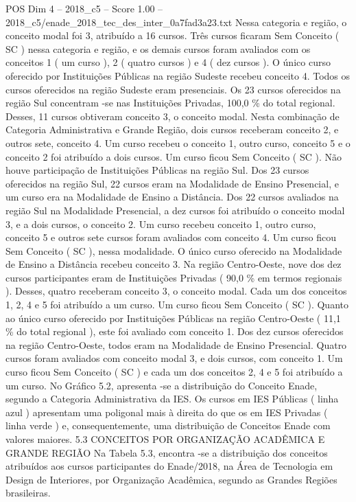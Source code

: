 \begin{textsample}{POS Dim 4 – 2018\_c5 – Score 1.00 – 2018\_c5/enade\_2018\_tec\_des\_inter\_0a7fad3a23.txt}
Nessa categoria e região, o conceito modal foi 3, atribuído a 16 cursos.
Três cursos ficaram Sem Conceito ( SC ) nessa categoria e região, e os demais cursos foram avaliados com os conceitos 1 ( um curso ), 2 ( quatro cursos ) e 4 ( dez cursos ).
O único curso oferecido por Instituições Públicas na região Sudeste recebeu conceito 4.
Todos os cursos oferecidos na região Sudeste eram presenciais.
Os 23 cursos oferecidos na região Sul concentram -se nas Instituições Privadas, 100,0 \% do total regional.
Desses, 11 cursos obtiveram conceito 3, o conceito modal.
Nesta combinação de Categoria Administrativa e Grande Região, dois cursos receberam conceito 2, e outros sete, conceito 4.
Um curso recebeu o conceito 1, outro curso, conceito 5 e o conceito 2 foi atribuído a dois cursos.
Um curso ficou Sem Conceito ( SC ).
Não houve participação de Instituições Públicas na região Sul.
Dos 23 cursos oferecidos na região Sul, 22 cursos eram na Modalidade de Ensino Presencial, e um curso era na Modalidade de Ensino a Distância.
Dos 22 cursos avaliados na região Sul na Modalidade Presencial, a dez cursos foi atribuído o conceito modal 3, e a dois cursos, o conceito 2.
Um curso recebeu conceito 1, outro curso, conceito 5 e outros sete cursos foram avaliados com conceito 4.
Um curso ficou Sem Conceito ( SC ), nessa modalidade.
O único curso oferecido na Modalidade de Ensino a Distância recebeu conceito 3.
Na região Centro-Oeste, nove dos dez cursos participantes eram de Instituições Privadas ( 90,0 \% em termos regionais ).
Desses, quatro receberam conceito 3, o conceito modal.
Cada um dos conceitos 1, 2, 4 e 5 foi atribuído a um curso.
Um curso ficou Sem Conceito ( SC ).
Quanto ao único curso oferecido por Instituições Públicas na região Centro-Oeste ( 11,1 \% do total regional ), este foi avaliado com conceito 1.
Dos dez cursos oferecidos na região Centro-Oeste, todos eram na Modalidade de Ensino Presencial.
Quatro cursos foram avaliados com conceito modal 3, e dois cursos, com conceito 1.
Um curso ficou Sem Conceito ( SC ) e cada um dos conceitos 2, 4 e 5 foi atribuído a um curso.
No Gráfico 5.2, apresenta -se a distribuição do Conceito Enade, segundo a Categoria Administrativa da IES.
Os cursos em IES Públicas ( linha azul ) apresentam uma poligonal mais à direita do que os em IES Privadas ( linha verde ) e, consequentemente, uma distribuição de Conceitos Enade com valores maiores. 5.3 CONCEITOS POR ORGANIZAÇÃO ACADÊMICA E GRANDE REGIÃO Na Tabela 5.3, encontra -se a distribuição dos conceitos atribuídos aos cursos participantes do Enade/2018, na Área de Tecnologia em Design de Interiores, por Organização Acadêmica, segundo as Grandes Regiões brasileiras.

\end{textsample}
